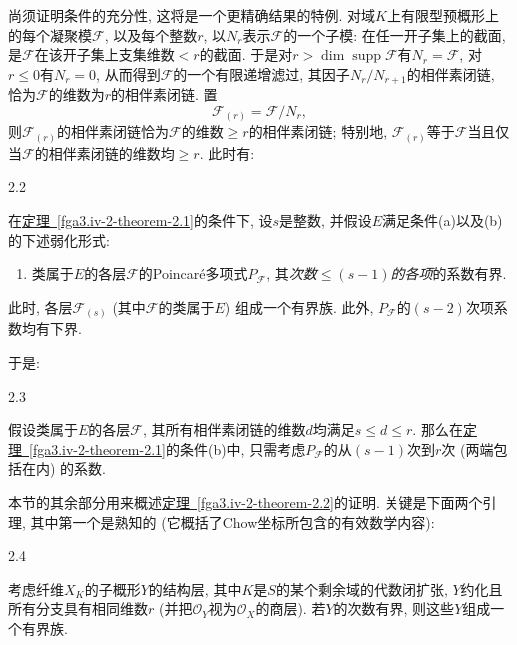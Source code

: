 \par{}尚须证明条件的充分性, 这将是一个更精确结果的特例. 对域\(K\)上有限型预概形上的每个凝聚模\(\mathscr {F}\), 以及每个整数\(r\), 以\(N_r\)表示\(\mathscr {F}\)的一个子模: 在任一开子集上的截面, 是\(\mathscr {F}\)在该开子集上支集维数\(<r\)的截面. 于是对\(r>\dim \operatorname {supp}\mathscr {F}\)有\(N_r=\mathscr {F}\), 对\(r\leqslant 0\)有\(N_r=0\), 从而得到\(\mathscr {F}\)的一个有限递增滤过, 其因子\(N_r/N_{r+1}\)的相伴素闭链, 恰为\(\mathscr {F}\)的维数为\(r\)的相伴素闭链. 置\[     \mathscr {F}_{(r)}     = \mathscr {F}/N_r,\] 则\(\mathscr {F}_{(r)}\)的相伴素闭链恰为\(\mathscr {F}\)的维数\(\geqslant  r\)的相伴素闭链; 特别地, \(\mathscr {F}_{(r)}\)等于\(\mathscr {F}\)当且仅当\(\mathscr {F}\)的相伴素闭链的维数均\(\geqslant  r\). 此时有:
\begin{theorem}{2.2}\label{fga3.iv-2-theorem-2.2}\skipsinglepar
\par{}在\hyperref[fga3.iv-2-theorem-2.1]{定理~\ref*{fga3.iv-2-theorem-2.1}}的条件下, 设\(s\)是整数, 并假设\(E\)满足条件(a)以及(b)的下述弱化形式: 
\begin{enumerate}
      
 \item[bs.]类属于\(E\)的各层\(\mathscr {F}\)的Poincaré多项式\(P_\mathscr {F}\), 其\emph{次数\(\leqslant  (s-1)\)的各项}的系数有界.

    
\end{enumerate} 此时, 各层\(\mathscr {F}_{(s)}\) (其中\(\mathscr {F}\)的类属于\(E\)) 组成一个有界族. 此外, \(P_\mathscr {F}\)的\((s-2)\)次项系数均有下界.
\end{theorem}
\par{}于是:
\begin{corollary}{2.3}\label{fga3.iv-2-corollary-2.3}\skipsinglepar
\par{}假设类属于\(E\)的各层\(\mathscr {F}\), 其所有相伴素闭链的维数\(d\)均满足\(s\leqslant  d\leqslant  r\). 那么在\hyperref[fga3.iv-2-theorem-2.1]{定理~\ref*{fga3.iv-2-theorem-2.1}}的条件(b)中, 只需考虑\(P_\mathscr {F}\)的从\((s-1)\)次到\(r\)次 (两端包括在内) 的系数.
\end{corollary}
\par{}本节的其余部分用来概述\hyperref[fga3.iv-2-theorem-2.2]{定理~\ref*{fga3.iv-2-theorem-2.2}}的证明. 关键是下面两个引理, 其中第一个是熟知的 (它概括了Chow坐标所包含的有效数学内容):
\begin{lemma}[Chow]{2.4}\label{fga3.iv-2-lemma-2.4}\skipsinglepar
\par{}考虑纤维\(X_K\)的子概形\(Y\)的结构层, 其中\(K\)是\(S\)的某个剩余域的代数闭扩张, \(Y\)约化且所有分支具有相同维数\(r\) (并把\(\mathcal {O}_Y\)视为\(\mathcal {O}_X\)的商层). 若\(Y\)的次数有界, 则这些\(Y\)组成一个有界族.
\end{lemma}
